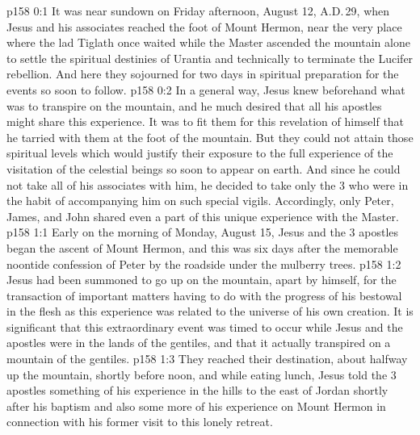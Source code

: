 \author{Midwayer Commission}
\vs p158 0:1 It was near sundown on Friday afternoon, August 12, A.D.\,29, when Jesus and his associates reached the foot of Mount Hermon, near the very place where the lad Tiglath once waited while the Master ascended the mountain alone to settle the spiritual destinies of Urantia and technically to terminate the Lucifer rebellion. And here they sojourned for two days in spiritual preparation for the events so soon to follow.
\vs p158 0:2 In a general way, Jesus knew beforehand what was to transpire on the mountain, and he much desired that all his apostles might share this experience. It was to fit them for this revelation of himself that he tarried with them at the foot of the mountain. But they could not attain those spiritual levels which would justify their exposure to the full experience of the visitation of the celestial beings so soon to appear on earth. And since he could not take all of his associates with him, he decided to take only the 3 who were in the habit of accompanying him on such special vigils. Accordingly, only Peter, James, and John shared even a part of this unique experience with the Master.
\vs p158 1:1 Early on the morning of Monday, August 15, Jesus and the 3 apostles began the ascent of Mount Hermon, and this was six days after the memorable noontide confession of Peter by the roadside under the mulberry trees.
\vs p158 1:2 Jesus had been summoned to go up on the mountain, apart by himself, for the transaction of important matters having to do with the progress of his bestowal in the flesh as this experience was related to the universe of his own creation. It is significant that this extraordinary event was timed to occur while Jesus and the apostles were in the lands of the gentiles, and that it actually transpired on a mountain of the gentiles.
\vs p158 1:3 They reached their destination, about halfway up the mountain, shortly before noon, and while eating lunch, Jesus told the 3 apostles something of his experience in the hills to the east of Jordan shortly after his baptism and also some more of his experience on Mount Hermon in connection with his former visit to this lonely retreat.
